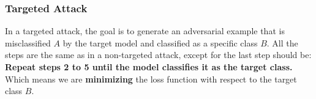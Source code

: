 \subsubsection{Targeted Attack}

In a targeted attack, the goal is to generate an adversarial example that is misclassified $A$ by the target model and classified as a specific class $B$. All the steps are the same as in a non-targeted attack, except for the last step should be: \textbf{Repeat steps 2 to 5 until the model classifies it as the target class.} Which means we are \textbf{minimizing} the loss function with respect to the target class $B$.


